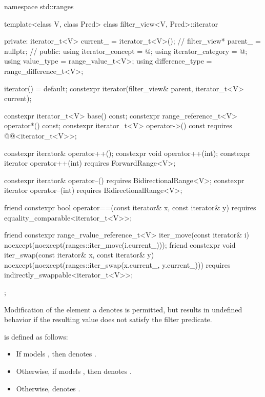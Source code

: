 %
\begin{codeblock}
namespace std::ranges {
  template<class V, class Pred>
  class filter_view<V, Pred>::iterator {
  private:
    iterator_t<V> current_ = iterator_t<V>();   // \expos
    filter_view* parent_ = nullptr;             // \expos
  public:
    using iterator_concept  = @\seebelow@;
    using iterator_category = @\seebelow@;
    using value_type        = range_value_t<V>;
    using difference_type   = range_difference_t<V>;

    iterator() = default;
    constexpr iterator(filter_view& parent, iterator_t<V> current);

    constexpr iterator_t<V> base() const;
    constexpr range_reference_t<V> operator*() const;
    constexpr iterator_t<V> operator->() const
      requires @@<iterator_t<V>>;

    constexpr iterator& operator++();
    constexpr void operator++(int);
    constexpr iterator operator++(int) requires ForwardRange<V>;

    constexpr iterator& operator--() requires BidirectionalRange<V>;
    constexpr iterator operator--(int) requires BidirectionalRange<V>;

    friend constexpr bool operator==(const iterator& x, const iterator& y)
      requires equality_comparable<iterator_t<V>>;

    friend constexpr range_rvalue_reference_t<V> iter_move(const iterator& i)
      noexcept(noexcept(ranges::iter_move(i.current_)));
    friend constexpr void iter_swap(const iterator& x, const iterator& y)
      noexcept(noexcept(ranges::iter_swap(x.current_, y.current_)))
      requires indirectly_swappable<iterator_t<V>>;
  };
}
\end{codeblock}

\pnum
Modification of the element a  denotes is
permitted, but results in undefined behavior if the resulting value does not
satisfy the filter predicate.

\pnum
{} is defined as follows:
\begin{itemize}
\item If  models , then
 denotes .

\item Otherwise, if  models , then
 denotes .

\item Otherwise,  denotes .
\end{itemize}

